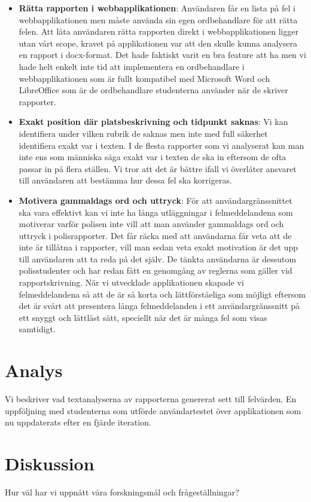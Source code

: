 \documentclass[swedish]{maucsthesis}
\begin{document}
\begin{itemize}
\item \textbf{Rätta rapporten i webbapplikationen}: Användaren får en lista på
  fel i webbapplikationen men måste använda sin egen ordbehandlare för att rätta
  felen. Att låta användaren rätta rapporten direkt i webbapplikationen ligger
  utan vårt scope, kravet på applikationen var att den skulle kunna analysera en
  rapport i docx-format. Det hade faktiskt varit en bra feature att ha men vi
  hade helt enkelt inte tid att implementera en ordbehandlare i
  webbapplikationen som är fullt kompatibel med Microsoft Word och LibreOffice som
  är de ordbehandlare studenterna använder när de skriver rapporter.
\item \textbf{Exakt position där platsbeskrivning och tidpunkt saknas}: Vi kan
  identifiera under vilken rubrik de saknas men inte med full säkerhet
  identifiera exakt var i texten. I de flesta rapporter som vi analyserat kan
  man inte ens som människa säga exakt var i texten de ska in eftersom de
  ofta passar in på flera ställen. Vi tror att det är bättre ifall vi överlåter
  ansvaret till användaren att bestämma hur dessa fel ska korrigeras.
\item \textbf{Motivera gammaldags ord och uttryck}: För att användargränssnittet
  ska vara effektivt kan vi inte ha långa utläggningar i felmeddelandena som
  motiverar varför polisen inte vill att man använder gammaldags ord och uttryck
  i polisrapporter. Det får räcka med att användarna får veta att de inte är
  tillåtna i rapporter, vill man sedan veta exakt motivation är det upp till
  användaren att ta reda på det själv. De tänkta användarna är dessutom
  polisstudenter och har redan fått en genomgång av reglerna som gäller vid
  rapportskrivning. När vi utvecklade applikationen skapade vi felmeddelandena
  så att de är så korta och lättförståeliga som möjligt eftersom det är svårt
  att presentera långa felmeddelanden i ett användargränssnitt på ett snyggt och
  lättläst sätt, speciellt när det är många fel som visas samtidigt.
\end{itemize}

\section{Analys}
Vi beskriver vad textanalyserna av rapporterna genererat sett till felvärden. En
uppföljning med studenterna som utförde användartestet över applikationen som nu
uppdaterats efter en fjärde iteration.
\section{Diskussion}
Hur väl har vi uppnått våra forskningsmål och frågeställningar?
\end{document}

